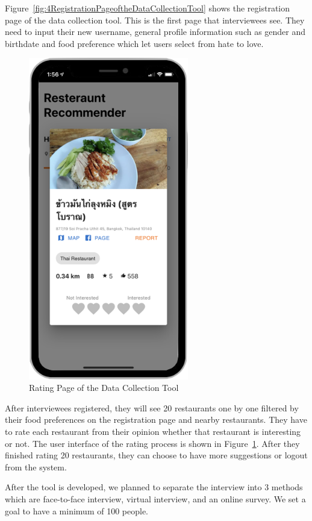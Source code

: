 \documentclass[12pt,oneside,openright,a4paper]{cpe-english-project}
\begin{document}
Figure~\ref{fig:4RegistrationPageoftheDataCollectionTool} shows the registration page of the data collection tool. This is the first page that interviewees see. They need to input their new username, general profile information such as gender and birthdate and food preference which let users select from hate to love.

\newpage
\begin{figure}[H]\centering
\includegraphics[height=400pt]{./images/4RatingPageoftheDataCollectionTool.png}
\caption{Rating Page of the Data Collection Tool}\label{fig:4RatingPageoftheDataCollectionTool}
\end{figure}

After interviewees registered, they will see 20 restaurants one by one filtered by their food preferences on the registration page and nearby restaurants. They have to rate each restaurant from their opinion whether that restaurant is interesting or not. The user interface of the rating process is shown in Figure~\ref{fig:4RatingPageoftheDataCollectionTool}. After they finished rating 20 restaurants, they can choose to have more suggestions or logout from the system.

After the tool is developed, we planned to separate the interview into 3 methods which are face-to-face interview, virtual interview, and an online survey. We set a goal to have a minimum of 100 people.
\end{document}
